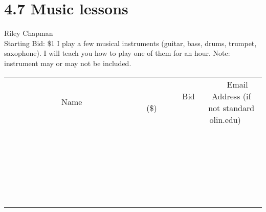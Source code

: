 \documentclass[11pt]{article}
\begin{document}
\section*{4.7 Music lessons}
Riley Chapman
\\
Starting Bid: \$1
\newline
I play a few musical instruments (guitar, bass, drums, trumpet, saxophone). I will teach you how to play one of them for an hour. Note: instrument may or may not be included.
\\[6ex]
\begin{tabular}{c c c}
~~~~~~~~~~~~~Name~~~~~~~~~~~~~ & ~~~~~~~~~Bid (\$)~~~~~~~~~  & ~~~Email Address (if not standard olin.edu)~~~\\
 & & \\
\hline
 & & \\
\hline
 & & \\
\hline
 & & \\
\hline
 & & \\
\hline
 & & \\
\hline
 & & \\
\hline
 & & \\
\hline
 & & \\
\hline
 & & \\
\hline
 & & \\
\hline
 & & \\
\hline
 & & \\
\hline
 & & \\
\hline
 & & \\
\hline
 & & \\
\hline
 & & \\
\hline
 & & \\
\hline
 & & \\
\hline
 & & \\
\hline
 & & \\
\hline
 & & \\
\hline
 & & \\
\hline
 & & \\
\hline
 & & \\
\hline
 & & \\
\hline
\end{tabular}
\newpage
\end{document}
